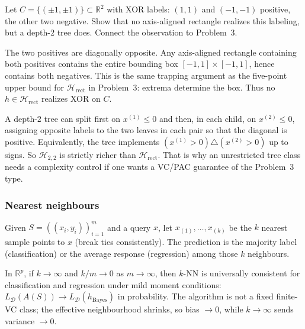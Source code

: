 \begin{exercise}
\label{ex:mlu-tree-xor}
Let $C=\{(\pm 1,\pm 1)\}\subset\mathbb{R}^2$ with XOR labels: $(1,1)$ and $(-1,-1)$ positive, the other two negative. Show that no axis-aligned rectangle realizes this labeling, but a depth-$2$ tree does. Connect the observation to Problem~3.
\end{exercise}

\begin{solution}
The two positives are diagonally opposite. Any axis-aligned rectangle containing both positives contains the entire bounding box $[-1,1]\times[-1,1]$, hence contains both negatives. This is the same trapping argument as the five-point upper bound for $\mathcal{H}_{\mathrm{rect}}$ in Problem~3: extrema determine the box. Thus no $h\in\mathcal{H}_{\mathrm{rect}}$ realizes XOR on $C$.

A depth-$2$ tree can split first on $x^{(1)}\le 0$ and then, in each child, on $x^{(2)}\le 0$, assigning opposite labels to the two leaves in each pair so that the diagonal is positive. Equivalently, the tree implements $(x^{(1)}>0)\triangle(x^{(2)}>0)$ up to signs. So $\mathcal{H}_{2,2}$ is strictly richer than $\mathcal{H}_{\mathrm{rect}}$. That is why an unrestricted tree class needs a complexity control if one wants a VC/PAC guarantee of the Problem~3 type.
\end{solution}


\subsubsection{Nearest neighbours}
\label{subsubsec:mlu-knn}

\begin{definition}[$k$-NN]
\label{def:mlu-knn}
Given $S=((x_i,y_i))_{i=1}^m$ and a query $x$, let $x_{(1)},\dots,x_{(k)}$ be the $k$ nearest sample points to $x$ (break ties consistently). The prediction is the majority label (classification) or the average response (regression) among those $k$ neighbours.
\end{definition}

\begin{theorem}
\label{thm:mlu-stone}
In $\mathbb{R}^p$, if $k\to\infty$ and $k/m\to 0$ as $m\to\infty$, then $k$-NN is universally consistent for classification and regression under mild moment conditions: $L_{\mathcal{D}}(A(S))\to L_{\mathcal{D}}(h_{\mathrm{Bayes}})$ in probability. The algorithm is not a fixed finite-VC class; the effective neighbourhood shrinks, so bias $\to 0$, while $k\to\infty$ sends variance $\to 0$.
\end{theorem}

